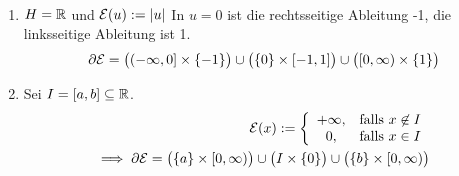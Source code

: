 \begin{beispiel}\
	\begin{enumerate}[label=(\arabic*)]
		\item $H=\mathbb{R}$ und $\mathcal{E}(u):=|u|$
		In $u=0$ ist die rechtsseitige Ableitung -1, die linksseitige Ableitung ist 1.
		\begin{align*}
			\partial\mathcal{E}=\big((-\infty,0]\times\lbrace-1\rbrace\big)\cup\big(\lbrace0\rbrace\times[-1,1]\big)\cup\big([0,\infty)\times\lbrace1\rbrace\big)
		\end{align*}
		\item Sei $I=[a,b]\subseteq\mathbb{R}$.
		\begin{align*}
			\mathcal{E}(x):=\left\lbrace\begin{array}{cl}
				+\infty, &\text{falls } x\not\in I\\
				0, &\text{falls } x\in I
			\end{array}\right.\\
			\implies
			\partial\mathcal{E}=\big(\lbrace a\rbrace\times[0,\infty)\big)\cup \big(I\times\lbrace 0\rbrace\big)\cup\big(\lbrace b\rbrace\times[0,\infty)\big)
		\end{align*}
	\end{enumerate}
\end{beispiel}

